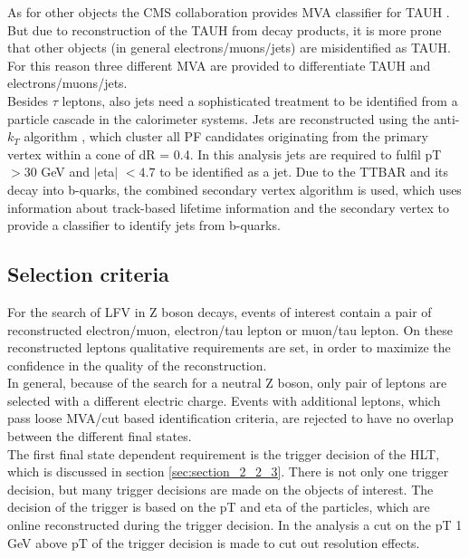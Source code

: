 As for other objects the \gls{CMS} collaboration provides \gls{MVA} classifier for \gls{TAUH} \cite{TAURECO}. But due to reconstruction of the \gls{TAUH} from decay products, it is more prone that other objects (in general electrons/muons/jets) are misidentified as \gls{TAUH}. For this reason three different \gls{MVA} are provided to differentiate \gls{TAUH} and electrons/muons/jets. \\

Besides $\tau$ leptons, also jets need a sophisticated treatment to be identified from a particle cascade in the calorimeter systems. Jets are reconstructed using the anti-$k_T$ algorithm \cite{ANTIKT}, which cluster all \gls{PF} candidates originating from the primary vertex within a cone of \gls{dR} = 0.4. In this analysis jets are required to fulfil \gls{pT} $> 30$ GeV and $|$\gls{eta}$|$ $ < 4.7$ to be identified as a jet. Due to the \gls{TTBAR} and its decay into b-quarks, the combined secondary vertex algorithm \cite{CSV} is used, which uses information about track-based lifetime information and the secondary vertex to provide a classifier to identify jets from b-quarks. 


\subsection{Selection criteria}
\label{sec:section_3_2_2}

For the search of \gls{LFV} in Z boson decays, events of interest contain a pair of reconstructed electron/muon, electron/tau lepton or muon/tau lepton. On these reconstructed leptons qualitative requirements are set, in order to maximize the confidence in the quality of the reconstruction. \\

In general, because of the search for a neutral Z boson, only pair of leptons are selected with a different electric charge. Events with additional leptons, which pass loose \gls{MVA}/cut based identification criteria, are rejected to have no overlap between the different final states.  \\

The first final state dependent requirement is the trigger decision of the \gls{HLT}, which is discussed in section \ref{sec:section_2_2_3}. There is not only one trigger decision, but many trigger decisions are made on the objects of interest. The decision of the trigger is based on the \gls{pT} and \gls{eta} of the particles, which are online reconstructed during the trigger decision. In the analysis a cut on the \gls{pT} 1 GeV above \gls{pT} of the trigger decision is made to cut out resolution effects. 

